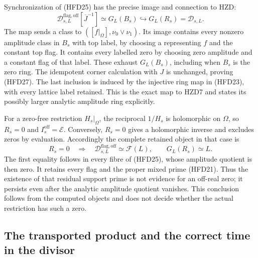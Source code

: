 Synchronization of (HFD25) has the precise
image and connection to HZD:
\begin{equation}\tag{HFD27}
 \mathcal D^{\mathrm{flag,off}}_{s,L}
       [\overline J^{-1}]
    \simeq G_L(B_s)\hookrightarrow
                 G_L(R_s)=\mathscr D_{s,L}.
\end{equation}
The map sends a class to
$([f|_\Omega],\nu_0\vee\nu_1)$.
Its image contains every nonzero amplitude
class in $B_s$ with top label, by choosing
a representing $f$ and the constant top
flag. It contains every labelled zero by
choosing zero amplitude and a constant
flag of that label. These exhaust
$G_L(B_s)$, including when $B_s$ is the
zero ring. The idempotent corner calculation
with $J$ is unchanged, proving (HFD27).
The last inclusion is induced by the
injective ring map in (HFD23), with every
lattice label retained. This is the exact
map to HZD7 and states its possibly larger
analytic amplitude ring explicitly.

For a zero-free restriction $H_s|_\Omega$,
the reciprocal $1/H_s$ is holomorphic on
$\Omega$, so $R_s=0$ and
$I_s^{\mathrm{off}}=\mathcal E$.
Conversely, $R_s=0$ gives a holomorphic
inverse and excludes zeros by evaluation.
Accordingly the complete retained object
in that case is
\begin{equation}\tag{HFD28}
 R_s=0
 \quad\Longrightarrow\quad
 \mathcal D^{\mathrm{flag,off}}_{s,L}
          \simeq\mathcal F(L),\qquad
 G_L(R_s)\simeq L .
\end{equation}
The first equality follows in every fibre
of (HFD25), whose amplitude quotient is
then zero. It retains every flag and the
proper mixed prime (HFD21).
Thus the existence of that residual
support prime is not evidence for an
off-real zero; it persists even after
the analytic amplitude quotient vanishes.
This conclusion follows from the computed
objects and does not decide whether the
actual restriction has such a zero.

\subsection{The transported product and the correct time in the divisor}

